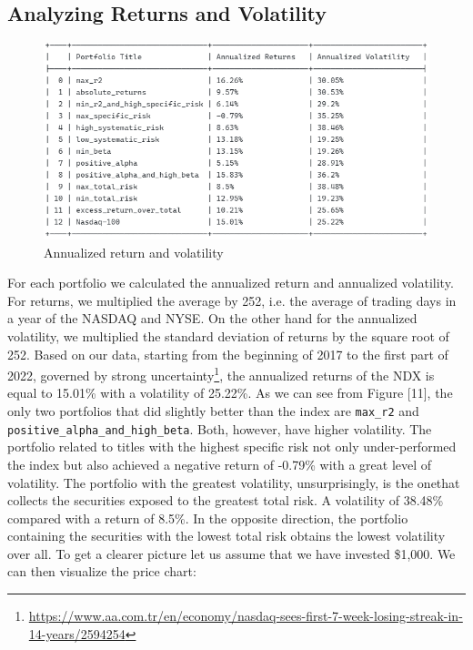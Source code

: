 \documentclass[twocolumn]{article}
\begin{document}
\subsection{Analyzing Returns and Volatility}
\begin{figure}[t]
\centering\includegraphics[scale=0.7]{baseMetrics.png}
\caption{Annualized return and volatility}
\end{figure}
For each portfolio we calculated the annualized return and annualized volatility. For returns, we multiplied the average by 252, i.e. the average of trading days in a year of the NASDAQ and NYSE. On the other hand for the annualized volatility, we multiplied the standard deviation of returns by the square root of 252. Based on our data, starting from the beginning of 2017 to the first part of 2022, governed by strong uncertainty\footnote{\url{https://www.aa.com.tr/en/economy/nasdaq-sees-first-7-week-losing-streak-in-14-years/2594254}}, the annualized returns of the NDX is equal to 15.01\% with a volatility of 25.22\%. As we can see from Figure [11], the only two portfolios that did slightly better than the index are \texttt{max\_r2} and \texttt{positive\_alpha\_and\_high\_beta}. Both, however, have higher volatility. The portfolio related to titles with the highest specific risk not only under-performed the index but also achieved a negative return of -0.79\% with a great level of volatility. The portfolio with the greatest volatility, unsurprisingly, is the one\newpage that collects the securities exposed to the greatest total risk. A volatility of 38.48\% compared with a return of 8.5\%. In the opposite direction, the portfolio containing the securities with the lowest total risk obtains the lowest volatility over all. To get a clearer picture let us assume that we have invested \$1,000. We can then visualize the price chart:
\end{document}
